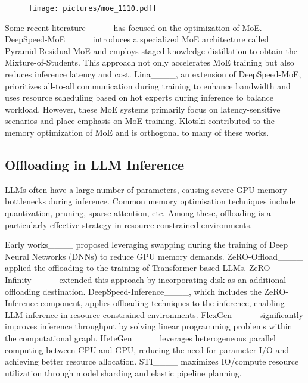 \begin{figure}[t]
  \centering
  \texttt{[image: pictures/moe\_1110.pdf]}
  \caption{}
  \label{figure:2}
\end{figure}

Some recent literature____ has focused on the optimization of MoE. DeepSpeed-MoE____ introduces a specialized MoE architecture called Pyramid-Residual MoE and employs staged knowledge distillation to obtain the Mixture-of-Students. This approach not only accelerates MoE training but also reduces inference latency and cost. Lina____, an extension of DeepSpeed-MoE, prioritizes all-to-all communication during training to enhance bandwidth and uses resource scheduling based on hot experts during inference to balance workload. However, these MoE systems primarily focus on latency-sensitive scenarios and place emphasis on MoE training. Klotski contributed to the memory optimization of MoE and is orthogonal to many of these works.

\subsection{Offloading in LLM Inference}
\label{section:2.2}
LLMs often have a large number of parameters, causing severe GPU memory bottlenecks during inference. Common memory optimisation techniques include quantization\newtext{____}, pruning\newtext{____}, sparse attention\newtext{____}, etc. Among these, offloading is a particularly effective strategy in resource-constrained environments. 

Early works____ proposed leveraging swapping during the training of Deep Neural Networks (DNNs) to reduce GPU memory demands. ZeRO-Offload____ applied the offloading to the training of Transformer-based LLMs. ZeRO-Infinity____ extended this approach by incorporating disk as an additional offloading destination. DeepSpeed-Inference____, which includes the ZeRO-Inference component, applies offloading techniques to the inference, enabling LLM inference in resource-constrained environments. FlexGen____ significantly improves inference throughput by solving linear programming problems within the computational graph. HeteGen____ leverages heterogeneous parallel computing between CPU and GPU, reducing the need for parameter I/O and achieving better resource allocation. STI____ maximizes IO/compute resource utilization through model sharding and elastic pipeline planning. 

